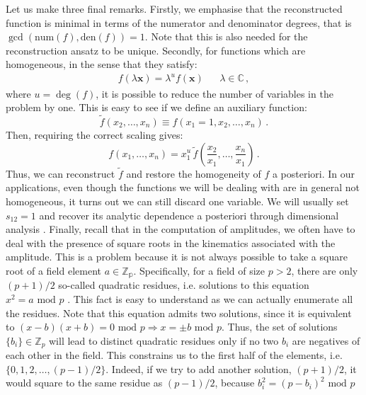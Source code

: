 \documentclass[main.tex]{subfiles}
\begin{document}
Let us make three final remarks. Firstly, we emphasise that the reconstructed function is minimal in terms of the numerator and denominator degrees, that is $\gcd \left(\text{num}(f), \text{den}(f) \right) = 1$. Note that this is also needed for the reconstruction ansatz to be unique. Secondly, for functions which are homogeneous, in the sense that they satisfy:
\begin{align}
    f(\lambda \mathbf{x}) = \lambda^u f(\mathbf{x}) && \lambda \in \mathbb{C} \,,
\end{align}
where $u=\deg (f)$, it is possible to reduce the number of variables in the problem by one. This is easy to see if we define an auxiliary function:
\begin{equation}
    \tilde{f}(x_2, \ldots, x_n) \equiv f(x_1=1, x_2, \ldots, x_n)\,.
\end{equation}
Then, requiring the correct scaling gives:
\begin{equation}
    f(x_1, \ldots, x_n) = x_1^u \, \tilde{f}\left(\frac{x_2}{x_1}, \ldots, \frac{x_n}{x_1}\right) \,.
\end{equation}
Thus, we can reconstruct $\tilde{f}$ and restore the homogeneity of $f$ a posteriori. In our applications, even though the functions we will be dealing with are in general not homogeneous, it turns out we can still discard one variable. We will usually set $s_{12} = 1$ and recover its analytic dependence a posteriori through dimensional analysis  . Finally, recall that in the computation of amplitudes, we often have to deal with the presence of square roots in the kinematics associated with the amplitude. This is a problem because it is not always possible to take a square root of a field element $a \in \mathbb{Z_p}$. Specifically, for a field of size $p>2$, there are only $(p+1)/2$ so-called quadratic residues, i.e. solutions to this equation $x^2=a \text{ mod } p$ \cite{hardy2008introduction}. This fact is easy to understand as we can actually enumerate all the residues. Note that this equation admits two solutions, since it is equivalent to $(x-b)(x+b)=0 \text{ mod } p \Longrightarrow x = \pm b \text{ mod } p$. Thus, the set of solutions $\{b_i\} \in \mathbb{Z}_p$ will lead to distinct quadratic residues only if no two $b_i$ are negatives of each other in the field. This constrains us to the first half of the elements, i.e. $\{0, 1, 2, \ldots, (p-1)/2 \}$. Indeed, if we try to add another solution, $(p+1)/2$, it would square to the same residue as $(p-1)/2$, because $b_i^2 = (p-b_i)^2 \text{ mod }p$
\end{document}
